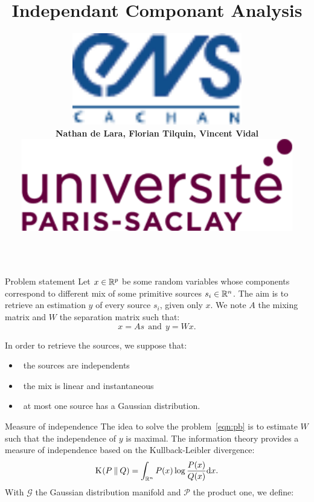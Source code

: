 \documentclass{beamer}
\title{\Huge Independant Componant Analysis}
\author[Lara, Tilquin, Vidal]
{
	\parbox{.25\textwidth}{\includegraphics[height=4cm]{ENS_cachan.pdf}}%
	\parbox{.5\textwidth}{\hfil \large \textbf{Nathan de Lara, Florian Tilquin, Vincent Vidal} \hfil}%
	\parbox{.25\textwidth}{\hspace{2cm} \includegraphics[height=4cm]{UPS.png}}%
}
\institute[Université Paris-Saclay]{\huge \textbf{Master Mathématiques, Vision et Apprentissage}}
\date{}
\newcommand{\Kl}[3][]{\mathrm K_{#1}\!\zp{#2\:\|\:#3}}
\newcommand{\zD}{\mathcal}
\begin{document}
\begin{frame}{}
	\maketitle
\begin{columns}[T]
\begin{column}{.48\linewidth}


\begin{block}{Problem statement}
Let $x\in\mathbb{R}^p$ be some random variables whose components correspond to different mix of some primitive sources $s_i\in\mathbb{R}^n$. The aim is to retrieve an estimation $y$ of every source $s_i$, given only $x$. We note $A$ the mixing matrix and $W$ the separation matrix such that:
\begin{equation}
\label{eqn:pb}
 x = A s \ \ \mbox{and} \ \ y = W x.
\end{equation}

In order to retrieve the sources, we suppose that:\begin{itemize}
\item \ the sources are independents
\item \ the mix is linear and instantaneous
\item \ at most one source has a Gaussian distribution.  
\end{itemize}
\end{block}


\begin{block}{Measure of independence}
The idea to solve the problem~\ref{eqn:pb} is to estimate $W$ such that the independence of $y$ is maximal.
The information theory provides a measure of independence based on the Kullback-Leibler divergence:
\begin{equation}
  \Kl PQ = \int_{\zR^n} P(x) \log\frac{P(x)}{Q(x)} \zdx x.
\end{equation}
With $\zD G$ the Gaussian distribution manifold and $\zD P$ the product one, we define:


\end{block}
\end{column}
\end{columns}
\end{frame}
\end{document}
